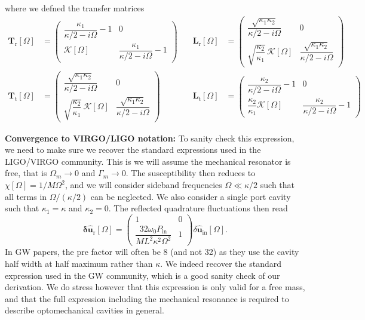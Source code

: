  where we defned the transfer matrices 
\begin{equation*}
  \begin{alignedat}{3}
     \mathbf{T}_{\mathrm{r}}[\Omega] &=\begin{pmatrix}
  \dfrac{\kappa_1}{\kappa/2-i\Omega}  -1  & 0 \\
  \mathcal{K}[\Omega]  &  \dfrac{\kappa_1}{\kappa/2-i\Omega}  -1 
\end{pmatrix}  \quad
 & \mathbf{L}_{\mathrm{r}}[\Omega] &= \begin{pmatrix}
   \dfrac{ \sqrt{\kappa_1 \kappa_2}}{\kappa/2-i\Omega}   & 0 \\
  \sqrt{\dfrac{\kappa_2}{\kappa_1}} \, \mathcal{K}[\Omega] &   \dfrac{ \sqrt{\kappa_1 \kappa_2}}{\kappa/2-i\Omega}  
\end{pmatrix} \\
        \mathbf{T}_{\mathrm{t}}[\Omega] &=  \begin{pmatrix}
   \dfrac{ \sqrt{\kappa_1 \kappa_2}}{\kappa/2-i\Omega}   & 0 \\
  \sqrt{\dfrac{\kappa_2}{\kappa_1}} \, \mathcal{K}[\Omega] &   \dfrac{ \sqrt{\kappa_1 \kappa_2}}{\kappa/2-i\Omega}  
\end{pmatrix}  \quad 
& \mathbf{L}_{\mathrm{t}}[\Omega]&= \begin{pmatrix}
  \dfrac{\kappa_2}{\kappa/2-i\Omega}  -1  & 0 \\
  \dfrac{\kappa_2}{\kappa_1}\mathcal{K}[\Omega]  &  \dfrac{\kappa_2}{\kappa/2-i\Omega}  -1 
\end{pmatrix} 
  \end{alignedat}
\end{equation*}


\noindent \textbf{Convergence to VIRGO/LIGO notation:} To sanity check this expression, we need to make sure we recover the standard expressions used in the LIGO/VIRGO community. This is we will assume the mechanical resonator is free, that is $\Omega_m \rightarrow 0$ and $\Gamma_m \rightarrow 0$. The susceptibility then reduces to $\chi[\Omega] = 1/ M \Omega^2$, and we will consider sideband frequencies $\Omega \ll \kappa/2$ such that all terms in $\Omega/(\kappa/2)$ can be neglected. We also consider a single port cavity such that $\kappa_1 = \kappa$ and $\kappa_2=0$. The reflected quadrature fluctuations then read
\begin{equation}
\mathbf{\delta \hat{u}_{\mathrm{r}}}[\Omega]
=
\begin{pmatrix}
  1   & 0 \\[12pt]
  \dfrac{32 \omega_0P_{\mathrm{in}}}{M L^2\kappa^2 \Omega^2}    &  1
\end{pmatrix}
\delta\hat{\mathbf u}_{\mathrm{in}}[\Omega].
\end{equation}
In GW papers, the pre factor will often be 8 (and not 32) as they use the cavity half width at half maximum rather than $\kappa$. We indeed recover the standard expression used in the GW community, which is a good sanity check of our derivation. We do stress however that this expression is only valid for a free mass, and that the full expression including the mechanical resonance is required to describe optomechanical cavities in general. \\


